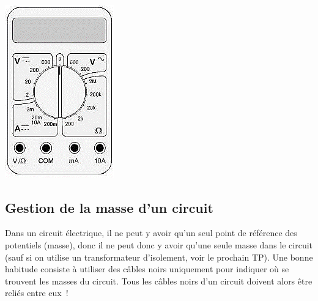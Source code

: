 \documentclass[../main/main.tex]{subfiles}
\begin{document}
\begin{minipage}[t]{.3\linewidth}
	~

	\begin{center}
		\includegraphics[width=\linewidth]{multi}
	\end{center}
\end{minipage}

\subsection{Gestion de la masse d'un circuit}

Dans un circuit électrique, il ne peut y avoir qu'un seul point de référence des
potentiels (masse), donc il ne peut donc y avoir qu'une seule masse dans le
circuit (sauf si on utilise un transformateur d'isolement, voir le prochain TP).
Une bonne habitude consiste à utiliser des câbles noirs uniquement pour indiquer
où se trouvent les masses du circuit. Tous les câbles noirs d'un circuit doivent
alors être reliés entre eux~!
\end{document}
